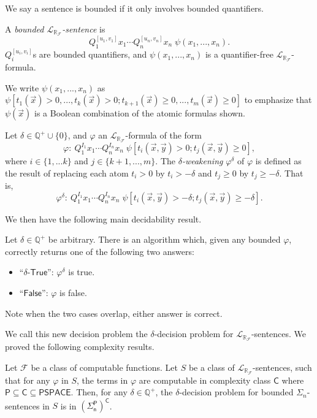 \documentclass[envcountsect]{llncs}
\newcommand{\lrf}{\mathcal{L}_{\mathbb{R}_{\mathcal{F}}}}
\begin{document}
We say a sentence is bounded if it only involves bounded quantifiers.
\begin{definition}[Bounded $\lrf$-Sentences]
A {\em bounded $\lrf$-sentence} is
$$Q_1^{[u_1,v_1]}x_1\cdots Q_n^{[u_n,v_n]}x_n\;\psi(x_1,...,x_n).$$
$Q_i^{[u_i,v_i]}$s are bounded quantifiers, and $\psi(x_1,...,x_n)$ is a
quantifier-free $\lrf$-formula.
\end{definition}
We write $\psi(x_1,...,x_n)$ as $\psi[t_1(\vec
x)>0,...,t_k(\vec x)>0; t_{k+1}(\vec x)\geq 0,...,t_m(\vec
x)\geq 0]$ to emphasize that $\psi(\vec x)$ is a Boolean
combination of the atomic formulas shown. 
\begin{definition}\label{variants}
Let $\delta\in \mathbb{Q}^+\cup\{0\}$, and $\varphi$ an
$\lrf$-formula of the form
$$\varphi: \ Q_1^{I_1}x_1\cdots Q_n^{I_n}x_n\;\psi[t_i(\vec x, \vec y)>0;
t_j(\vec x, \vec
y)\geq 0],$$ where $i\in\{1,...k\}$ and $j\in\{k+1,...,m\}$. The {\em
$\delta$-weakening} $\varphi^{\delta}$ of $\varphi$ is
defined as the result of replacing each atom $t_i > 0$ by $t_i >
-\delta$ and $t_j \geq 0$ by $t_j \geq -\delta$. That is, 
$$\varphi^{\delta}:\ Q_1^{I_1}x_1\cdots Q_n^{I_n}x_n\;\psi[t_i(\vec x, \vec
y)>-\delta; t_j(\vec x,
\vec y)\geq -\delta].$$
\end{definition}

We then have the following main decidability result. 
\begin{theorem} Let $\delta\in\mathbb{Q}^+$ be
arbitrary. There is an algorithm which, given any bounded $\varphi$,
correctly returns one of the following two answers:
\begin{itemize}
\item ``$\delta$-$\mathsf{True}$'': $\varphi^{\delta}$ is true.
\item ``$\mathsf{False}$'': $\varphi$ is false.
\end{itemize}
Note when the two cases overlap, either answer is correct. 
\end{theorem}
We call this new decision problem the $\delta$-decision problem for
$\lrf$-sentences. We proved the following complexity results. 
\begin{theorem}[Complexity]\label{compmain}
Let $\mathcal{F}$ be a class of computable functions. Let $S$ be a class of
$\lrf$-sentences, such that for any $\varphi$ in $S$, the
terms in $\varphi$ are computable in complexity class $\mathsf{C}$ where
$\mathsf{P\subseteq \mathsf{C}\subseteq \mathsf{PSPACE}}$.
Then, for any $\delta\in \mathbb{Q}^+$, the $\delta$-decision problem for
bounded $\Sigma_n$-sentences in $S$ is in $\mathsf{(\Sigma_n^P)^C}$.
\end{theorem}
\end{document}

